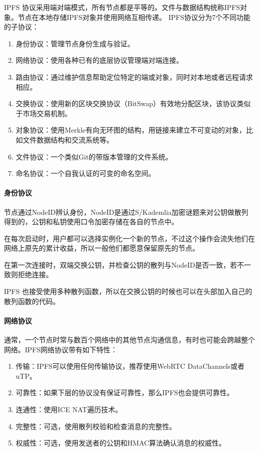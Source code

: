 \documentclass{ctexart}
\begin{document}
IPFS 协议采用端对端模式，所有节点都是平等的。文件与数据结构统称IPFS对象。节点在本地存储IPFS对象并使用网络互相传递。 IPFS协议分为7个不同功能的子协议：
\begin{enumerate}
	\item 身份协议：管理节点身份生成与验证。
	\item 网络协议：使用各种已有的底层协议管理端对端连接。
	\item 路由协议：通过维护信息帮助定位特定的端或对象，同时对本地或者远程请求相应。
	\item 交换协议：使用新的区块交换协议（BitSwap）有效地分配区块，该协议类似于市场交易机制。
	\item 对象协议：使用Merkle有向无环图的结构，用链接来建立不可变动的对象，比如文件数据结构和交流系统等。
	\item 文件协议：一个类似Git的带版本管理的文件系统。
	\item 命名协议：一个自我认证的可变的命名空间。
\end{enumerate}
\paragraph{身份协议}
节点通过NodeID辨认身份，NodeID是通过S/Kademlia加密谜题来对公钥做散列得到的，公钥和私钥使用口令加密存储在各自的节点中。

在每次启动时，用户都可以选择实例化一个新的节点，不过这个操作会流失他们在网络上原先的累计收益，所以一般他们都愿意保留原先的节点。

在第一次连接时，双端交换公钥，并检查公钥的散列与NodeID是否一致，若不一致则拒绝连接。

IPFS 也接受使用多种散列函数，所以在交换公钥的时候也可以在头部加入自己的散列函数的代码。
\paragraph{网络协议}
通常，一个节点时常与数百个网络中的其他节点沟通信息，有时也可能会跨越整个网络。IPFS网络协议带有如下特性：
\begin{enumerate}
	\item 传输：IPFS可以使用任何传输协议，推荐使用WebRTC DataChannels或者uTP。
	\item 可靠性：如果下层的协议没有保证可靠性，那么IPFS也会提供可靠性。
	\item 连通性：使用ICE NAT遍历技术。
	\item 完整性：可选，使用散列校验和检查消息的完整性。
	\item 权威性：可选，使用发送者的公钥和HMAC算法确认消息的权威性。
\end{enumerate}
\end{document}
